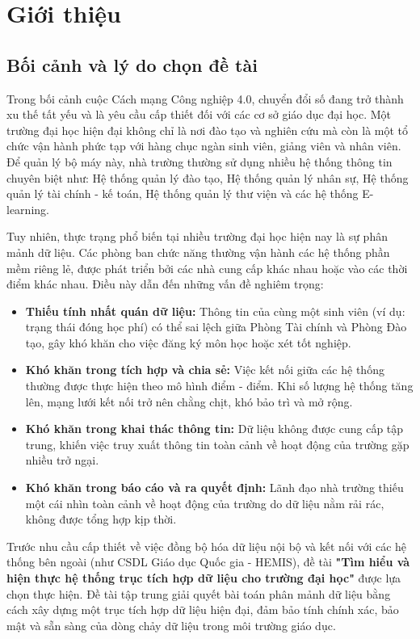 \chapter{Giới thiệu}

\section{Bối cảnh và lý do chọn đề tài}

Trong bối cảnh cuộc Cách mạng Công nghiệp 4.0, chuyển đổi số đang trở thành xu thế tất yếu và là yêu cầu cấp thiết đối với các cơ sở giáo dục đại học. Một trường đại học hiện đại không chỉ là nơi đào tạo và nghiên cứu mà còn là một tổ chức vận hành phức tạp với hàng chục ngàn sinh viên, giảng viên và nhân viên. Để quản lý bộ máy này, nhà trường thường sử dụng nhiều hệ thống thông tin chuyên biệt như: Hệ thống quản lý đào tạo, Hệ thống quản lý nhân sự, Hệ thống quản lý tài chính - kế toán, Hệ thống quản lý thư viện và các hệ thống E-learning.

Tuy nhiên, thực trạng phổ biến tại nhiều trường đại học hiện nay là sự phân mảnh dữ liệu. Các phòng ban chức năng thường vận hành các hệ thống phần mềm riêng lẻ, được phát triển bởi các nhà cung cấp khác nhau hoặc vào các thời điểm khác nhau. Điều này dẫn đến những vấn đề nghiêm trọng:

\begin{itemize}
    \item \textbf{Thiếu tính nhất quán dữ liệu:} Thông tin của cùng một sinh viên (ví dụ: trạng thái đóng học phí) có thể sai lệch giữa Phòng Tài chính và Phòng Đào tạo, gây khó khăn cho việc đăng ký môn học hoặc xét tốt nghiệp.
    \item \textbf{Khó khăn trong tích hợp và chia sẻ:} Việc kết nối giữa các hệ thống thường được thực hiện theo mô hình điểm - điểm. Khi số lượng hệ thống tăng lên, mạng lưới kết nối trở nên chằng chịt, khó bảo trì và mở rộng.
    \item \textbf{Khó khăn trong khai thác thông tin:} Dữ liệu không được cung cấp tập trung, khiến việc truy xuất thông tin toàn cảnh về hoạt động của trường gặp nhiều trở ngại.
    \item \textbf{Khó khăn trong báo cáo và ra quyết định:} Lãnh đạo nhà trường thiếu một cái nhìn toàn cảnh về hoạt động của trường do dữ liệu nằm rải rác, không được tổng hợp kịp thời.
\end{itemize}

Trước nhu cầu cấp thiết về việc đồng bộ hóa dữ liệu nội bộ và kết nối với các hệ thống bên ngoài (như CSDL Giáo dục Quốc gia - HEMIS), đề tài \textbf{"Tìm hiểu và hiện thực hệ thống trục tích hợp dữ liệu cho trường đại học"} được lựa chọn thực hiện. Đề tài tập trung giải quyết bài toán phân mảnh dữ liệu bằng cách xây dựng một trục tích hợp dữ liệu hiện đại, đảm bảo tính chính xác, bảo mật và sẵn sàng của dòng chảy dữ liệu trong môi trường giáo dục.

